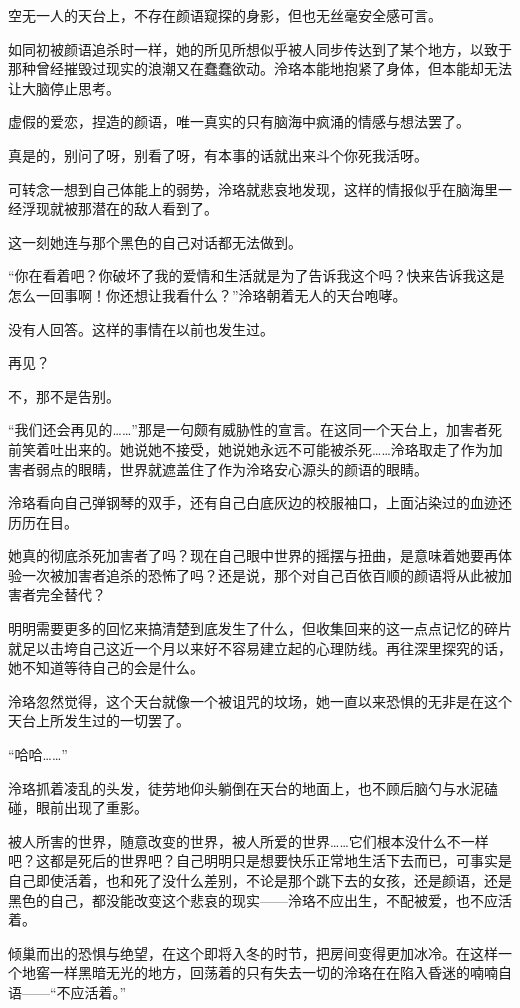 \documentclass[UTF8, scheme = chinese, openany]{ctexbook}
\begin{document}
空无一人的天台上，不存在颜语窥探的身影，但也无丝毫安全感可言。

如同初被颜语追杀时一样，她的所见所想似乎被人同步传达到了某个地方，以致于那种曾经摧毁过现实的浪潮又在蠢蠢欲动。泠珞本能地抱紧了身体，但本能却无法让大脑停止思考。

虚假的爱恋，捏造的颜语，唯一真实的只有脑海中疯涌的情感与想法罢了。

真是的，别问了呀，别看了呀，有本事的话就出来斗个你死我活呀。

可转念一想到自己体能上的弱势，泠珞就悲哀地发现，这样的情报似乎在脑海里一经浮现就被那潜在的敌人看到了。

这一刻她连与那个黑色的自己对话都无法做到。

“你在看着吧？你破坏了我的爱情和生活就是为了告诉我这个吗？快来告诉我这是怎么一回事啊！你还想让我看什么？”泠珞朝着无人的天台咆哮。

没有人回答。这样的事情在以前也发生过。

再见？

不，那不是告别。

“我们还会再见的……”那是一句颇有威胁性的宣言。在这同一个天台上，加害者死前笑着吐出来的。她说她不接受，她说她永远不可能被杀死……泠珞取走了作为加害者弱点的眼睛，世界就遮盖住了作为泠珞安心源头的颜语的眼睛。

泠珞看向自己弹钢琴的双手，还有自己白底灰边的校服袖口，上面沾染过的血迹还历历在目。

她真的彻底杀死加害者了吗？现在自己眼中世界的摇摆与扭曲，是意味着她要再体验一次被加害者追杀的恐怖了吗？还是说，那个对自己百依百顺的颜语将从此被加害者完全替代？

明明需要更多的回忆来搞清楚到底发生了什么，但收集回来的这一点点记忆的碎片就足以击垮自己这近一个月以来好不容易建立起的心理防线。再往深里探究的话，她不知道等待自己的会是什么。

泠珞忽然觉得，这个天台就像一个被诅咒的坟场，她一直以来恐惧的无非是在这个天台上所发生过的一切罢了。

“哈哈……”

泠珞抓着凌乱的头发，徒劳地仰头躺倒在天台的地面上，也不顾后脑勺与水泥磕碰，眼前出现了重影。

被人所害的世界，随意改变的世界，被人所爱的世界……它们根本没什么不一样吧？这都是死后的世界吧？自己明明只是想要快乐正常地生活下去而已，可事实是自己即使活着，也和死了没什么差别，不论是那个跳下去的女孩，还是颜语，还是黑色的自己，都没能改变这个悲哀的现实——泠珞不应出生，不配被爱，也不应活着。

倾巢而出的恐惧与绝望，在这个即将入冬的时节，把房间变得更加冰冷。在这样一个地窖一样黑暗无光的地方，回荡着的只有失去一切的泠珞在在陷入昏迷的喃喃自语——“不应活着。”
\end{document}

